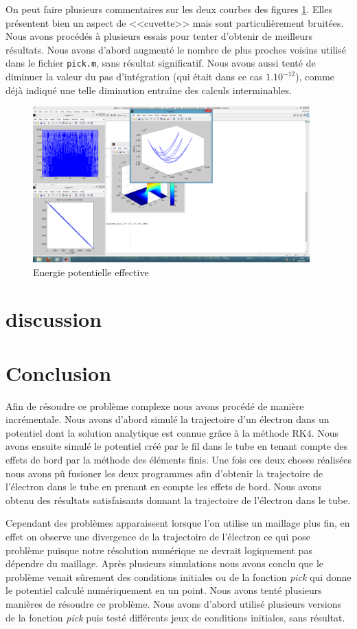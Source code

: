 \documentclass[a4paper,12pt]{article}
\begin{document}
On peut faire plusieurs commentaires sur les deux courbes des figures \ref{f Eeff}. Elles présentent bien un aspect de <<cuvette>> mais sont particulièrement bruitées. Nous avons procédés à plusieurs essais pour tenter d'obtenir de meilleurs résultats. Nous avons d'abord augmenté le nombre de plus proches voisins utilisé dans le fichier \verb|pick.m|, sans résultat significatif. Nous avons aussi tenté de diminuer la valeur du pas d'intégration (qui était dans ce cas $1.10^{-12}$), comme déjà indiqué une telle diminution entraîne des calculs interminables.


\begin{figure}[h]
\centering
\includegraphics[height=6cm]{images/Eeff_3d_ci_ 2.png}
\caption{Energie potentielle effective}
\label{f Eeff}
\end{figure}

\section{discussion}



\section{Conclusion}
Afin de résoudre ce problème complexe nous avons procédé de manière incrémentale. Nous avons d'abord simulé la trajectoire d'un électron dans un potentiel dont la solution analytique est connue grâce à la méthode RK4. Nous avons ensuite simulé le potentiel créé par le fil dans le tube en tenant compte des effets de bord par la méthode des éléments finis. Une fois ces deux choses réalisées nous avons pû fusioner les deux programmes afin d'obtenir la trajectoire de l'électron dans le tube en prenant en compte les effets de bord.  Nous avons obtenu des résultats satisfaisants donnant la trajectoire de l'électron dans le tube.


Cependant des problèmes apparaissent lorsque l'on utilise un maillage plus fin, en effet on observe une divergence de la trajectoire de l'électron ce qui pose problème puisque notre résolution numérique ne devrait logiquement pas dépendre du maillage. Après plusieurs simulations nous avons conclu que le problème venait sûrement des conditions initiales ou de la fonction \emph{pick} qui donne le potentiel calculé numériquement en un point. Nous avons tenté plusieurs manières de résoudre ce problème. Nous avons d'abord utilisé plusieurs versions de la fonction \emph{pick} puis testé différents jeux de conditions initiales, sans résultat.
\end{document}

